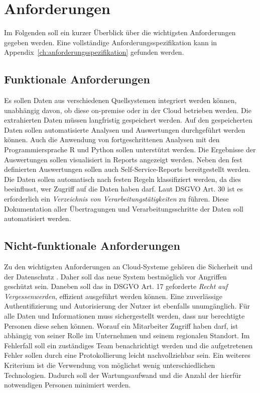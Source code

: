 \section{Anforderungen}
\label{sec:anforderungen}
Im Folgenden soll ein kurzer Überblick über die wichtigsten Anforderungen gegeben werden. Eine vollständige Anforderungsspezifikation kann in Appendix~\ref{ch:anforderungsspezifikation} gefunden werden. 

\subsection{Funktionale Anforderungen}
Es sollen Daten aus verschiedenen Quellsystemen integriert werden können, unabhängig davon, ob diese on-premise oder in der Cloud betrieben werden. Die extrahierten Daten müssen langfristig gespeichert werden. Auf den gespeicherten Daten sollen automatisierte Analysen und Auswertungen durchgeführt werden können. Auch die Anwendung von fortgeschrittenen Analysen mit den Programmiersprache R und Python sollen unterstützt werden. Die Ergebnisse der Auswertungen sollen visualisiert in Reports angezeigt werden. Neben den fest definierten Auswertungen sollen auch Self-Service-Reports bereitgestellt werden. Die Daten sollen automatisch nach festen Regeln klassifiziert werden, da dies beeinflusst, wer Zugriff auf die Daten haben darf. Laut DSGVO Art. 30 ist es erforderlich ein \textit{Verzeichnis von Verarbeitungstätigkeiten} zu führen. Diese Dokumentation aller Übertragungen und Verarbeitungsschritte der Daten soll automatisiert werden.

\subsection{Nicht-funktionale Anforderungen}
Zu den wichtigsten Anforderungen an Cloud-Systeme gehören die Sicherheit und der Datenschutz \cite{gurjar_cloud_2013}. Daher soll das neue System bestmöglich vor Angriffen geschützt sein. Daneben soll das in DSGVO Art. 17 geforderte \textit{Recht auf Vergessenwerden}, effizient ausgeführt werden können. Eine zuverlässige Authentifizierung und Autorisierung der Nutzer ist ebenfalls unumgänglich. Für alle Daten und Informationen muss sichergestellt werden, dass nur berechtigte Personen diese sehen können. Worauf ein Mitarbeiter Zugriff haben darf, ist abhängig von seiner Rolle im Unternehmen und seinem regionalen Standort. Im Fehlerfall soll ein zuständiges Team benachrichtigt werden und die aufgetretenen Fehler sollen durch eine Protokollierung leicht nachvollziehbar sein. Ein weiteres Kriterium ist die Verwendung von möglichst wenig unterschiedlichen Technologien. Dadurch soll der Wartungsaufwand und die Anzahl der hierfür notwendigen Personen minimiert werden.